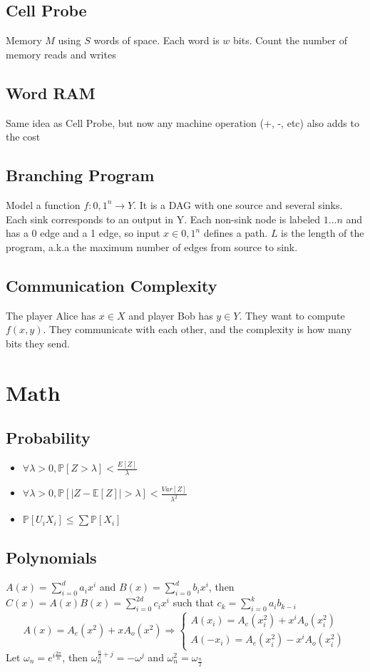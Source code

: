 \documentclass{article}
\begin{document}
\subsection*{Cell Probe}
Memory $M$ using $S$ words of space. Each word is $w$ bits. Count the number of memory reads and writes
\subsection*{Word RAM}
Same idea as Cell Probe, but now any machine operation (+, -, etc) also adds to the cost
\subsection*{Branching Program}
Model a function $f:{0, 1}^n\rightarrow Y$. It is a DAG with one source and several sinks.
Each sink corresponds to an output in Y. Each non-sink node is labeled $1...n$ and has a 0 edge and a 1 edge, so input $x\in{0,1}^n$ defines a path.
$L$ is the length of the program, a.k.a the maximum number of edges from source to sink.
\subsection*{Communication Complexity}
The player Alice has $x\in X$ and player Bob has $y\in Y$. They want to compute $f(x, y)$. They communicate with each other, and the complexity is how many bits they send.

\noindent\makebox[\linewidth]{\rule{\textwidth}{0.4pt}}
\section*{Math}
\subsection*{Probability}
\begin{itemize}
    \item $\forall \lambda > 0, \mathbb{P}[Z > \lambda] < \frac{E[Z]}{\lambda}$
    \item $\forall \lambda > 0, \mathbb{P}[|Z - \mathbb{E}[Z]| > \lambda] < \frac{Var[Z]}{\lambda^2}$
    \item $\mathbb{P}[U_i X_i] \leq \sum \mathbb{P}[X_i]$
\end{itemize}
\subsection*{Polynomials}
$A(x) = \sum_{i=0}^da_ix^i$ and $B(x)=\sum_{i=0}^db_ix^i$, then $C(x)=A(x)B(x) = \sum_{i=0}^{2d}c_ix^i$ such that $c_k=\sum_{i=0}^ka_ib_{k-i}$
\[
    A(x) = A_e(x^2)+xA_o(x^2) \Rightarrow \begin{cases}
        A(x_i) = A_e(x_i^2)+x^iA_o(x_i^2)\\
        A(-x_i) = A_e(x_i^2)-x^iA_o(x_i^2)
    \end{cases}
\]
Let $\omega_n = e^{i\frac{2\pi}{n}}$, then $\omega_n^{\frac{n}{2}+j} = -\omega^j$ and $\omega_n^2 = \omega_{\frac{n}{2}}$
\end{document}
